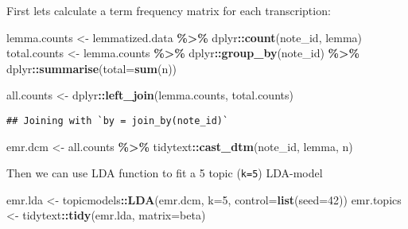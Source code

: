 \documentclass[
]{article}
\newenvironment{Shaded}{\begin{snugshade}}{\end{snugshade}}
\newcommand{\AttributeTok}[1]{\textcolor[rgb]{0.13,0.29,0.53}{#1}}
\newcommand{\DecValTok}[1]{\textcolor[rgb]{0.00,0.00,0.81}{#1}}
\newcommand{\FunctionTok}[1]{\textcolor[rgb]{0.13,0.29,0.53}{\textbf{#1}}}
\newcommand{\NormalTok}[1]{#1}
\newcommand{\OtherTok}[1]{\textcolor[rgb]{0.56,0.35,0.01}{#1}}
\newcommand{\SpecialCharTok}[1]{\textcolor[rgb]{0.81,0.36,0.00}{\textbf{#1}}}
\newcommand{\StringTok}[1]{\textcolor[rgb]{0.31,0.60,0.02}{#1}}
\begin{document}
First lets calculate a term frequency matrix for each transcription:

\begin{Shaded}
\begin{Highlighting}[]
\NormalTok{lemma.counts }\OtherTok{\textless{}{-}}\NormalTok{ lemmatized.data }\SpecialCharTok{\%\textgreater{}\%}\NormalTok{ dplyr}\SpecialCharTok{::}\FunctionTok{count}\NormalTok{(note\_id, lemma)}
\NormalTok{total.counts }\OtherTok{\textless{}{-}}\NormalTok{ lemma.counts }\SpecialCharTok{\%\textgreater{}\%} 
\NormalTok{                      dplyr}\SpecialCharTok{::}\FunctionTok{group\_by}\NormalTok{(note\_id) }\SpecialCharTok{\%\textgreater{}\%} 
\NormalTok{                      dplyr}\SpecialCharTok{::}\FunctionTok{summarise}\NormalTok{(}\AttributeTok{total=}\FunctionTok{sum}\NormalTok{(n))}

\NormalTok{all.counts }\OtherTok{\textless{}{-}}\NormalTok{ dplyr}\SpecialCharTok{::}\FunctionTok{left\_join}\NormalTok{(lemma.counts, total.counts)}
\end{Highlighting}
\end{Shaded}

\begin{verbatim}
## Joining with `by = join_by(note_id)`
\end{verbatim}

\begin{Shaded}
\begin{Highlighting}[]
\NormalTok{emr.dcm }\OtherTok{\textless{}{-}}\NormalTok{ all.counts }\SpecialCharTok{\%\textgreater{}\%}\NormalTok{ tidytext}\SpecialCharTok{::}\FunctionTok{cast\_dtm}\NormalTok{(note\_id, lemma, n)}
\end{Highlighting}
\end{Shaded}

Then we can use LDA function to fit a 5 topic (\texttt{k=5}) LDA-model

\begin{Shaded}
\begin{Highlighting}[]
\NormalTok{emr.lda }\OtherTok{\textless{}{-}}\NormalTok{ topicmodels}\SpecialCharTok{::}\FunctionTok{LDA}\NormalTok{(emr.dcm, }\AttributeTok{k=}\DecValTok{5}\NormalTok{, }\AttributeTok{control=}\FunctionTok{list}\NormalTok{(}\AttributeTok{seed=}\DecValTok{42}\NormalTok{))}
\NormalTok{emr.topics }\OtherTok{\textless{}{-}}\NormalTok{ tidytext}\SpecialCharTok{::}\FunctionTok{tidy}\NormalTok{(emr.lda, }\AttributeTok{matrix=}\StringTok{\textquotesingle{}beta\textquotesingle{}}\NormalTok{)}
\end{Highlighting}
\end{Shaded}
\end{document}

